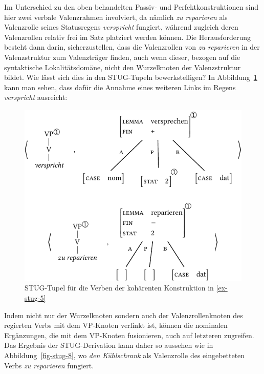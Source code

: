 Im Unterschied zu den oben behandelten Passiv- und Perfektkonstruktionen sind hier zwei verbale Valenzrahmen involviert, da nämlich {\it zu reparieren} als Valenzrolle seines Statusregens {\it verspricht} fungiert, während zugleich deren Valenzrollen relativ frei im Satz platziert werden können. Die Herausforderung besteht dann darin, sicherzustellen, dass die Valenzrollen von {\it zu reparieren} in der Valenzstruktur zum Valenzträger finden, auch wenn dieser, bezogen auf die syntaktische Lokalitätsdomäne, nicht den Wurzelknoten der Valenzstruktur bildet. Wie lässt sich dies in den STUG-Tupeln bewerkstelligen? In Abbildung~\ref{fig-stug-7} kann man sehen, dass dafür die Annahme eines weiteren Links im Regens {\it verspricht} ausreicht:
\begin{figure}[t]
\centering
\includegraphics{graphics/abb97.pdf}
\caption{\label{fig-stug-7}STUG-Tupel für die Verben der kohärenten Konstruktion in \ref{ex-stug-5}}
\end{figure}
Indem nicht nur der Wurzelknoten sondern auch der Valenzrollenknoten des regierten Verbs mit dem VP-Knoten verlinkt ist, können die nominalen Ergänzungen, die mit dem VP-Knoten fusionieren, auch auf letzteren zugreifen.  
Das Ergebnis der STUG-Derivation kann daher so aussehen wie in Abbildung~\ref{fig-stug-8}, wo {\it den Kühlschrank} als Valenzrolle des eingebetteten Verbs {\it zu reparieren} fungiert.
